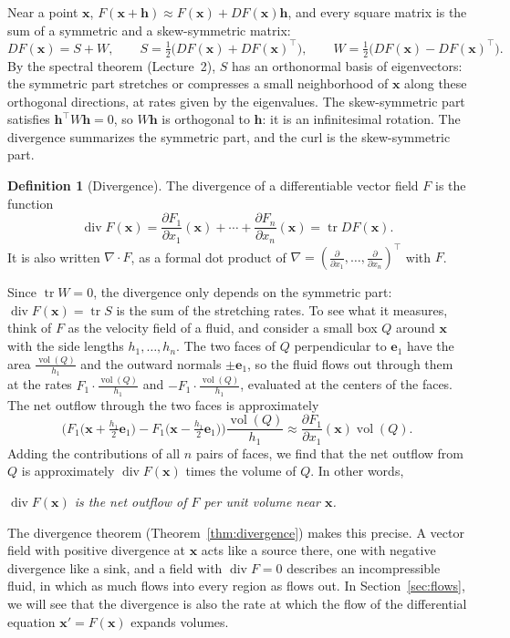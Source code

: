 \documentclass[11pt]{article}
\theoremstyle{definition}
\newtheorem{definition}{Definition}[section]
\theoremstyle{plain}
\theoremstyle{remark}
\DeclareMathOperator{\tr}{tr}
\DeclareMathOperator{\Div}{div}
\DeclareMathOperator{\vol}{vol}
\begin{document}
Near a point $\mathbf{x}$, $F(\mathbf{x} + \mathbf{h}) \approx F(\mathbf{x}) + DF(\mathbf{x})\mathbf{h}$, and every square matrix is the sum of a symmetric and a skew-symmetric matrix:
\[DF(\mathbf{x}) = S + W, \qquad S = \tfrac{1}{2}\big(DF(\mathbf{x}) + DF(\mathbf{x})^\top\big), \qquad W = \tfrac{1}{2}\big(DF(\mathbf{x}) - DF(\mathbf{x})^\top\big).\]
By the spectral theorem (Lecture~2), $S$ has an orthonormal basis of eigenvectors: the symmetric part stretches or compresses a small neighborhood of $\mathbf{x}$ along these orthogonal directions, at rates given by the eigenvalues. The skew-symmetric part satisfies $\mathbf{h}^\top W\mathbf{h} = 0$, so $W\mathbf{h}$ is orthogonal to $\mathbf{h}$: it is an infinitesimal rotation. The divergence summarizes the symmetric part, and the curl is the skew-symmetric part.

\begin{definition}[Divergence]\label{def:divergence}
    The divergence of a differentiable vector field $F$ is the function
    \[\Div F(\mathbf{x}) = \frac{\partial F_1}{\partial x_1}(\mathbf{x}) + \cdots + \frac{\partial F_n}{\partial x_n}(\mathbf{x}) = \tr DF(\mathbf{x}).\]
    It is also written $\nabla \cdot F$, as a formal dot product of $\nabla = (\frac{\partial}{\partial x_1}, \ldots, \frac{\partial}{\partial x_n})^\top$ with $F$.
\end{definition}

Since $\tr W = 0$, the divergence only depends on the symmetric part: $\Div F(\mathbf{x}) = \tr S$ is the sum of the stretching rates. To see what it measures, think of $F$ as the velocity field of a fluid, and consider a small box $Q$ around $\mathbf{x}$ with the side lengths $h_1, \ldots, h_n$. The two faces of $Q$ perpendicular to $\mathbf{e}_1$ have the area $\frac{\vol(Q)}{h_1}$ and the outward normals $\pm\mathbf{e}_1$, so the fluid flows out through them at the rates $F_1 \cdot \frac{\vol(Q)}{h_1}$ and $-F_1 \cdot \frac{\vol(Q)}{h_1}$, evaluated at the centers of the faces. The net outflow through the two faces is approximately
\[\Big(F_1\big(\mathbf{x} + \tfrac{h_1}{2}\mathbf{e}_1\big) - F_1\big(\mathbf{x} - \tfrac{h_1}{2}\mathbf{e}_1\big)\Big)\frac{\vol(Q)}{h_1} \approx \frac{\partial F_1}{\partial x_1}(\mathbf{x})\vol(Q).\]
Adding the contributions of all $n$ pairs of faces, we find that the net outflow from $Q$ is approximately $\Div F(\mathbf{x})$ times the volume of $Q$. In other words,
\begin{center}
    \emph{$\Div F(\mathbf{x})$ is the net outflow of $F$ per unit volume near $\mathbf{x}$.}
\end{center}
The divergence theorem (Theorem~\ref{thm:divergence}) makes this precise. A vector field with positive divergence at $\mathbf{x}$ acts like a source there, one with negative divergence like a sink, and a field with $\Div F = 0$ describes an incompressible fluid, in which as much flows into every region as flows out. In Section~\ref{sec:flows}, we will see that the divergence is also the rate at which the flow of the differential equation $\mathbf{x}' = F(\mathbf{x})$ expands volumes.
\end{document}
